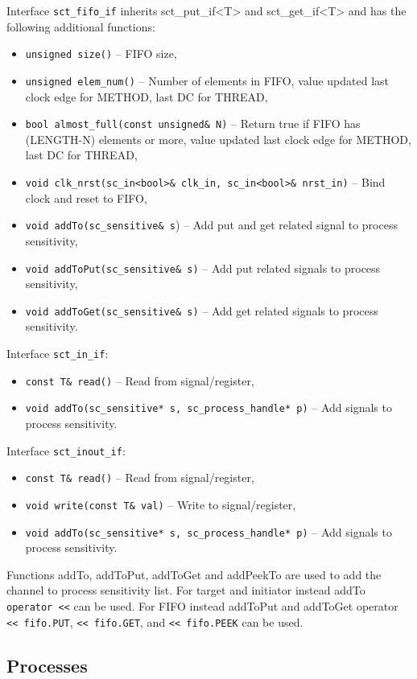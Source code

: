 Interface {\tt sct\_fifo\_if} inherits sct\_put\_if<T> and sct\_get\_if<T> and has the following additional functions:
\begin{itemize}
\item {\tt unsigned size()} -- FIFO size,
\item {\tt unsigned elem\_num()} -- Number of elements in FIFO, value updated last clock edge for METHOD, last DC for THREAD,
\item {\tt bool almost\_full(const unsigned\& N)} -- Return true if FIFO has (LENGTH-N) elements or more, value updated last clock edge for METHOD, last DC for THREAD,
\item {\tt void clk\_nrst(sc\_in<bool>\& clk\_in, sc\_in<bool>\& nrst\_in)} -- Bind clock and reset to FIFO,
\item {\tt void addTo(sc\_sensitive\& s}) -- Add put and get related signal to process sensitivity,
\item {\tt void addToPut(sc\_sensitive\& s)} -- Add put related signals to process sensitivity,
\item {\tt void addToGet(sc\_sensitive\& s)} -- Add get related signals to process sensitivity.
\end{itemize}

Interface {\tt sct\_in\_if}:
\begin{itemize}
\item {\tt const T\& read()} -- Read from signal/register,
\item {\tt void addTo(sc\_sensitive* s, sc\_process\_handle* p)} -- Add signals to process sensitivity.
\end{itemize}

Interface {\tt sct\_inout\_if}:
\begin{itemize}
\item {\tt const T\& read()} -- Read from signal/register,
\item {\tt void write(const T\& val)} -- Write to signal/register,
\item {\tt void addTo(sc\_sensitive* s, sc\_process\_handle* p)} -- Add signals to process sensitivity.
\end{itemize}

Functions addTo, addToPut, addToGet and addPeekTo are used to add the channel to process sensitivity list. For target and initiator instead addTo {\tt operator <<} can be used. For FIFO instead addToPut and addToGet operator {\tt << fifo.PUT}, {\tt << fifo.GET}, and {\tt << fifo.PEEK} can be used.

\subsection{Processes}\label{section:sct_processes}

